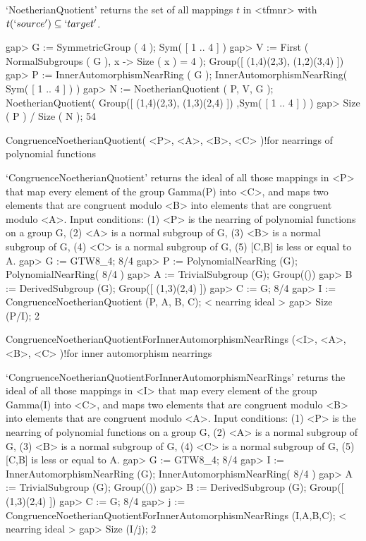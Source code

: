 `NoetherianQuotient' returns the set of all mappings $t$ in <tfmnr>
with $t(`source') \subseteq `target'$.

\beginexample
    gap> G := SymmetricGroup ( 4 );
    Sym( [ 1 .. 4 ] )
    gap> V := First ( NormalSubgroups ( G ), x -> Size ( x ) = 4 );
    Group([ (1,4)(2,3), (1,2)(3,4) ])
    gap> P := InnerAutomorphismNearRing ( G );
    InnerAutomorphismNearRing( Sym( [ 1 .. 4 ] ) )
    gap> N := NoetherianQuotient ( P, V, G );
    NoetherianQuotient( Group([ (1,4)(2,3), (1,3)(2,4) ]) ,Sym(
    [ 1 .. 4 ] ) )
    gap> Size ( P ) / Size ( N );
    54
\endexample

\>CongruenceNoetherianQuotient( <P>, <A>, <B>, <C> )!{for nearrings of polynomial functions}

`CongruenceNoetherianQuotient' returns the ideal of all those  mappings in <P> that
map every element of the group Gamma(P) into <C>, and maps two elements that
are congruent modulo <B> into elements that are congruent modulo <A>.
Input conditions: (1) <P> is the nearring of polynomial functions on a group G,
                  (2) <A> is a normal subgroup of G,
                  (3) <B> is a normal subgroup of G,
                  (4) <C> is a normal subgroup of G,
                  (5) [C,B] is less or equal to A.
\beginexample
    gap> G := GTW8_4;
    8/4
    gap> P := PolynomialNearRing (G);
    PolynomialNearRing( 8/4 )
    gap> A := TrivialSubgroup (G);
    Group(())
    gap> B := DerivedSubgroup (G);
    Group([ (1,3)(2,4) ])
    gap> C := G;
    8/4
    gap> I := CongruenceNoetherianQuotient (P, A, B, C);
    < nearring ideal >
    gap> Size (P/I);
    2
\endexample

\>CongruenceNoetherianQuotientForInnerAutomorphismNearRings (<I>, <A>, <B>, <C> )!{for inner automorphism nearrings}

`CongruenceNoetherianQuotientForInnerAutomorphismNearRings' returns the ideal of all those  mappings in <I> that
map every element of the group Gamma(I) into <C>, and maps two elements that
are congruent modulo <B> into elements that are congruent modulo <A>.
Input conditions: (1) <P> is the nearring of polynomial functions on a group G,
                  (2) <A> is a normal subgroup of G,
                  (3) <B> is a normal subgroup of G,
                  (4) <C> is a normal subgroup of G,
                  (5) [C,B] is less or equal to A.
\beginexample
    gap> G := GTW8_4;
    8/4
    gap> I := InnerAutomorphismNearRing (G);
    InnerAutomorphismNearRing( 8/4 )
    gap> A := TrivialSubgroup (G);
    Group(())
    gap> B := DerivedSubgroup (G);
    Group([ (1,3)(2,4) ])
    gap> C := G;
    8/4
    gap> j := CongruenceNoetherianQuotientForInnerAutomorphismNearRings (I,A,B,C);
    < nearring ideal >
    gap> Size (I/j);
    2
\endexample

